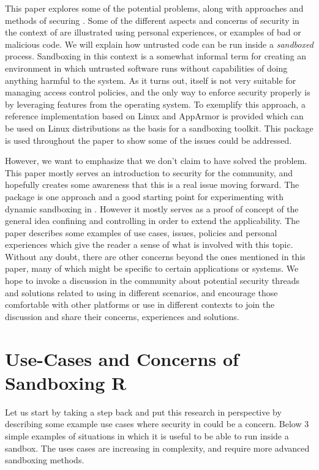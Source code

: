 \documentclass[article]{jss}
\begin{document}
This paper explores some of the potential problems, along with approaches and
methods of securing . Some of the different aspects and concerns of
security in the context of  are illustrated using personal
experiences, or examples of bad or malicious code. We will explain how untrusted
code can be run inside a \emph{sandboxed}  process. Sandboxing in
this context is a somewhat informal term for creating an environment in which
untrusted software runs without capabilities of doing anything harmful to the
system. As it turns out,  itself is not very suitable for managing
access control policies, and the only way to enforce security properly is by
leveraging features from the operating system. To exemplify this approach, a
reference implementation based on Linux and AppArmor is provided which can be
used on Linux distributions as the basis for a sandboxing toolkit. This package
is used throughout the paper to show some of the issues could be addressed.

However, we want to emphasize that we don't claim to have solved the problem.
This paper mostly serves an introduction to security for the 
community, and hopefully creates some awareness that this is a real issue moving
forward. The  package is one approach and a good starting point
for experimenting with dynamic sandboxing in . However it mostly
serves as a proof of concept of the general idea confining and controlling 
in order to extend the applicability. The paper describes some examples of use
cases, issues, policies and personal experiences which give the reader a sense
of what is involved with this topic. Without any doubt, there are other concerns
beyond the ones mentioned in this paper, many of which might be specific to
certain applications or systems. We hope to invoke a discussion in the community
about potential security threads and solutions related to using  in
different scenarios, and encourage those comfortable with other platforms or use
 in different contexts to join the discussion and share their
concerns, experiences and solutions.
 

\section{Use-Cases and Concerns of Sandboxing R}

Let us start by taking a step back and put this research in perspective by
describing some example use cases where security in  could be a
concern. Below 3 simple examples of situations in which it is useful to be able
to run  inside a sandbox. The uses cases are increasing in
complexity, and require more advanced sandboxing methods. 
\end{document}
